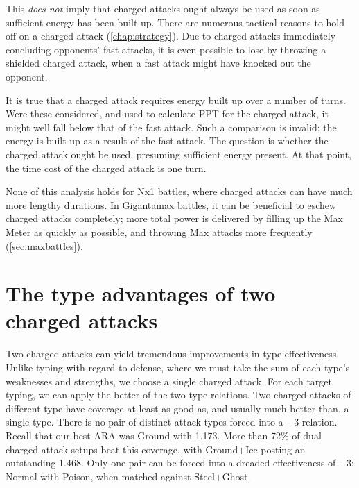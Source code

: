 This \textit{does not} imply that charged attacks ought always be used as soon as
  sufficient energy has been built up.
There are numerous tactical reasons to hold off on a charged attack (\autoref{chap:strategy}).
Due to charged attacks immediately concluding opponents' fast attacks,
 it is even possible to lose by throwing a shielded charged attack, when
 a fast attack might have knocked out the opponent.

It is true that a charged attack requires energy built up over a number of turns.
Were these considered, and used to calculate PPT for the charged attack,
  it might well fall below that of the fast attack.
Such a comparison is invalid; the energy is built up as a result of the fast attack.
The question is whether the charged attack ought be used, presuming sufficient energy present.
At that point, the time cost of the charged attack is one turn.

None of this analysis holds for Nx1 battles, where charged attacks can have much more lengthy durations.
In Gigantamax battles, it can be beneficial to eschew charged attacks completely;
 more total power is delivered by filling up the Max Meter as quickly as possible,
 and throwing Max attacks more frequently (\autoref{sec:maxbattles}).

\section{The type advantages of two charged attacks\label{sec:dualcharged}}
Two charged attacks can yield tremendous improvements in type effectiveness.
Unlike typing with regard to defense, where we must take the sum of each type's
 weaknesses and strengths, we choose a single charged attack.
For each target typing, we can apply the better of the two type relations.
Two charged attacks of different type have coverage at least as good as,
  and usually much better than, a single type.
There is no pair of distinct attack types forced into a −3 relation.
Recall that our best ARA was Ground with 1.173.
More than 72\% of dual charged attack setups beat this coverage,
 with Ground+Ice posting an outstanding 1.468.
Only one pair can be forced into a dreaded effectiveness of −3:
 Normal with Poison, when matched against Steel+Ghost.


